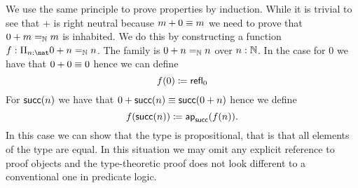 We use the same principle to prove properties by induction. While it
is trivial to see that $+$ is right neutral because $m + 0 \equiv m$
we need to prove that $0 + m =_\mathbb{N} m$ is inhabited. We do this by
constructing a function $f : \Pi_{n : \nat} 0 + n =_\Nat n$. 
The family is $0 + n =_\mathbb{N} n$ over $n : \mathbb{N}$. In the case
for $0$ we have that $0 + 0 \equiv 0$ hence we can define
\[ f(0) \coloneqq \mathsf{refl}_{0} \]
For $\mathsf{succ}(n)$ we have that $0 + \mathsf{succ}(n) \equiv \mathsf{succ}(0 +
n)$ hence we define 
\[ f(\mathsf{succ}(n)) \coloneqq \mathsf{ap}_{\mathsf{succ}}(f(n)). \]
In this case we can show that the type is propositional, that is that
all elements of the type are equal. In this situation we may omit any
explicit reference to proof objects and the type-theoretic proof does
not look different to a conventional one in predicate logic. 

